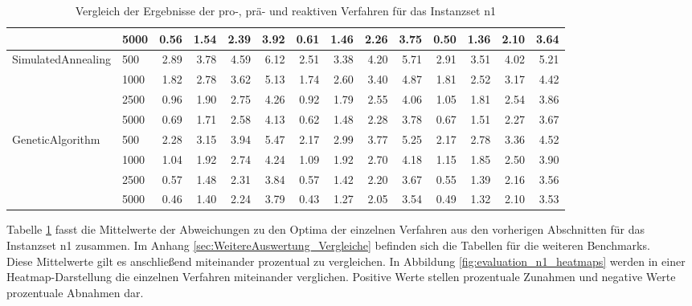 \begin{table}[H]
{\begin{tabular}{ll|rrrr|rrrr|rrrr}
                 & 5000 &           0.56 & 1.54 & 2.39 & 3.92 &            0.61 & 1.46 & 2.26 & 3.75 &          0.50 & 1.36 & 2.10 & 3.64 \\ \hline
SimulatedAnnealing & 500  &           2.89 & 3.78 & 4.59 & 6.12 &            2.51 & 3.38 & 4.20 & 5.71 &          2.91 & 3.51 & 4.02 & 5.21 \\
                 & 1000 &           1.82 & 2.78 & 3.62 & 5.13 &            1.74 & 2.60 & 3.40 & 4.87 &          1.81 & 2.52 & 3.17 & 4.42 \\
                 & 2500 &           0.96 & 1.90 & 2.75 & 4.26 &            0.92 & 1.79 & 2.55 & 4.06 &          1.05 & 1.81 & 2.54 & 3.86 \\
                 & 5000 &           0.69 & 1.71 & 2.58 & 4.13 &            0.62 & 1.48 & 2.28 & 3.78 &          0.67 & 1.51 & 2.27 & 3.67 \\ \hline
GeneticAlgorithm & 500  &           2.28 & 3.15 & 3.94 & 5.47 &            2.17 & 2.99 & 3.77 & 5.25 &          2.17 & 2.78 & 3.36 & 4.52 \\
                 & 1000 &           1.04 & 1.92 & 2.74 & 4.24 &            1.09 & 1.92 & 2.70 & 4.18 &          1.15 & 1.85 & 2.50 & 3.90 \\
                 & 2500 &           0.57 & 1.48 & 2.31 & 3.84 &            0.57 & 1.42 & 2.20 & 3.67 &          0.55 & 1.39 & 2.16 & 3.56 \\
                 & 5000 &           0.46 & 1.40 & 2.24 & 3.79 &            0.43 & 1.27 & 2.05 & 3.54 &          0.49 & 1.32 & 2.10 & 3.53 \\
\bottomrule
\end{tabular}
}
\caption{Vergleich der Ergebnisse der pro-, prä- und reaktiven Verfahren für das Instanzset n1}
\label{tab:comparision_n1}
\end{table}

Tabelle \ref{tab:comparision_n1} fasst die Mittelwerte der Abweichungen zu den Optima der einzelnen Verfahren aus den vorherigen Abschnitten für das Instanzset n1 zusammen. Im Anhang \ref{sec:WeitereAuswertung_Vergleiche} befinden sich die Tabellen für die weiteren Benchmarks. \\

Diese Mittelwerte gilt es anschließend miteinander prozentual zu vergleichen. In Abbildung \ref{fig:evaluation_n1_heatmaps} werden in einer Heatmap-Darstellung die einzelnen Verfahren miteinander verglichen. Positive Werte stellen prozentuale Zunahmen und negative Werte prozentuale Abnahmen dar. 

